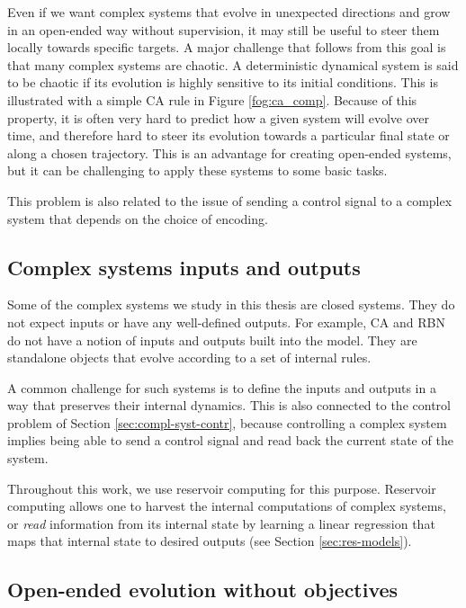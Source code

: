 Even if we want complex systems that evolve in unexpected directions and grow in
an open-ended way without supervision, it may still be useful to steer them
locally towards specific targets. A major challenge that follows from this goal
is that many complex systems are chaotic. A deterministic dynamical system is
said to be chaotic if its evolution is highly sensitive to its initial
conditions. This is illustrated with a simple \ac{CA} rule in Figure \ref{fog:ca_comp}. 
Because of this property, it is often very hard to predict how a
given system will evolve over time, and therefore hard to steer its evolution
towards a particular final state or along a chosen trajectory. This is an
advantage for creating open-ended systems, but it can be challenging to apply
these systems to some basic tasks.

This problem is also related to the issue of sending a control signal to a
complex system that depends on the choice of encoding.

\subsection{Complex systems inputs and outputs\label{sec:compl-syst-inputs}}

Some of the complex systems we study in this thesis are closed systems. They do
not expect inputs or have any well-defined outputs. For example, \ac{CA} and
\ac{RBN} do not have a notion of inputs and outputs built into the model. They
are standalone objects that evolve according to a set of internal rules.

A common challenge for such systems is to define the inputs and outputs in a way
that preserves their internal dynamics. This is also connected to the control
problem of Section \ref{sec:compl-syst-contr}, because controlling a complex
system implies being able to send a control signal and read back the current
state of the system.

Throughout this work, we use reservoir computing for this purpose. Reservoir
computing allows one to harvest the internal computations of complex systems, or
\emph{read} information from its internal state by learning a linear regression
that maps that internal state to desired outputs (see Section
\ref{sec:res-models}).



\subsection{Open-ended evolution without
  objectives}\label{sec:open-ended-evolution}

